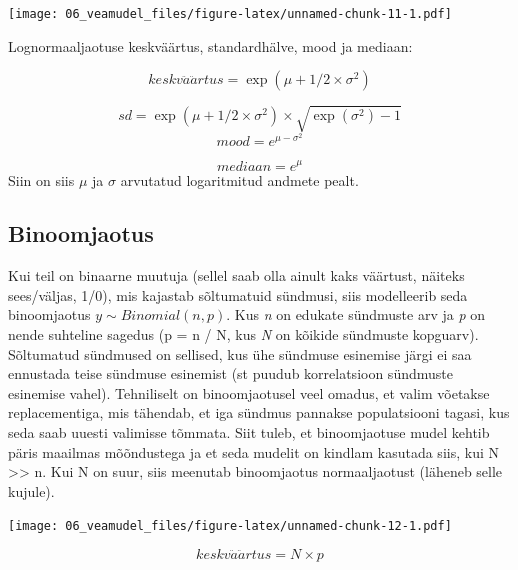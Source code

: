 \documentclass[]{book}
\newenvironment{Shaded}{\begin{snugshade}}{\end{snugshade}}
\newcommand{\KeywordTok}[1]{\textcolor[rgb]{0.13,0.29,0.53}{\textbf{#1}}}
\newcommand{\DecValTok}[1]{\textcolor[rgb]{0.00,0.00,0.81}{#1}}
\newcommand{\FloatTok}[1]{\textcolor[rgb]{0.00,0.00,0.81}{#1}}
\newcommand{\StringTok}[1]{\textcolor[rgb]{0.31,0.60,0.02}{#1}}
\newcommand{\CommentTok}[1]{\textcolor[rgb]{0.56,0.35,0.01}{\textit{#1}}}
\newcommand{\NormalTok}[1]{#1}
\begin{document}
\texttt{[image: 06\_veamudel\_files/figure-latex/unnamed-chunk-11-1.pdf]}

Lognormaaljaotuse keskväärtus, standardhälve, mood ja mediaan:

\[keskv\ddot{a}\ddot{a}rtus = \exp(\mu + 1/2 \times \sigma^2)\]

\[sd = \exp(\mu + 1/2 \times \sigma^2) \times \sqrt{\exp(\sigma^2) - 1}\]
\[mood = e^{\mu - \sigma^2}\]

\[mediaan = e^\mu\] Siin on siis \(\mu\) ja \(\sigma\) arvutatud
logaritmitud andmete pealt.

\subsection{Binoomjaotus}\label{binoomjaotus}

Kui teil on binaarne muutuja (sellel saab olla ainult kaks väärtust,
näiteks sees/väljas, 1/0), mis kajastab sõltumatuid sündmusi, siis
modelleerib seda binoomjaotus \(y \sim Binomial(n, p)\). Kus \emph{n} on
edukate sündmuste arv ja \emph{p} on nende suhteline sagedus (p = n / N,
kus \emph{N} on kõikide sündmuste kopguarv). Sõltumatud sündmused on
sellised, kus ühe sündmuse esinemise järgi ei saa ennustada teise
sündmuse esinemist (st puudub korrelatsioon sündmuste esinemise vahel).
Tehniliselt on binoomjaotusel veel omadus, et valim võetakse
replacementiga, mis tähendab, et iga sündmus pannakse populatsiooni
tagasi, kus seda saab uuesti valimisse tõmmata. Siit tuleb, et
binoomjaotuse mudel kehtib päris maailmas mõõndustega ja et seda mudelit
on kindlam kasutada siis, kui N \textgreater{}\textgreater{} n. Kui N on
suur, siis meenutab binoomjaotus normaaljaotust (läheneb selle kujule).

\begin{Shaded}
\end{Shaded}

\texttt{[image: 06\_veamudel\_files/figure-latex/unnamed-chunk-12-1.pdf]}

\[keskv\ddot{a}\ddot{a}rtus = N \times p\]
\end{document}
